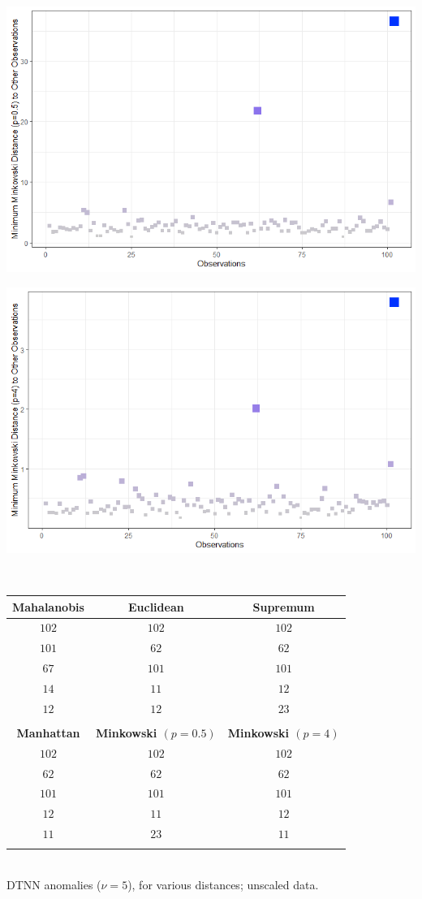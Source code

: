\documentclass[20pt,landscape,footrule,headrule]{foils}
\begin{document}
\newpage
\begin{center}
\includegraphics[width=\textwidth]{Images/AD_L1_2_min}
\end{center}
\newpage
\begin{center}
\includegraphics[width=\textwidth]{Images/AD_L4_min}
\end{center}
\newpage\ 
\begin{center}
\begin{tabular}{ccc}
\textbf{Mahalanobis} & 
\textbf{Euclidean}   & 
\textbf{Supremum}    \\ \hline
$102$ & $102$ & $102$ \\
$101$ & $62$  & $62$  \\
$67$  & $101$  & $101$ \\
$14$  & $11$ & $12$  \\
$12$  & $12$  & $23$  \\
& & \\
\textbf{Manhattan}   &
\textbf{Minkowski $(p=0.5)$} & \textbf{Minkowski $(p=4)$} \\ \hline
$102$ & $102$ & $102$ \\
$62$ & $62$  & $62$  \\
$101$  & $101$  & $101$ \\
$12$  & $11$ & $12$  \\
$11$  & $23$  & $11$  \\
& & \\
\end{tabular} \\ 
DTNN anomalies ($\nu=5$), for various distances; unscaled data.
\end{center}
\end{document}
